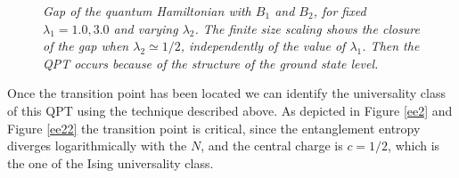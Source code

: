 \documentclass[aps,pra,superscriptaddress]{revtex4}
\renewcommand{\(}{\left(}
\renewcommand{\)}{\right)}
\renewcommand{\[}{\left[}
\renewcommand{\]}{\right]}
\begin{document}
\begin{figure}[H]
\center
{}
\caption{{\em Gap of the quantum Hamiltonian with $B_1$ and $B_2$, for fixed $\lambda_1=1.0,3.0$ and varying $\lambda_2$. The finite size scaling shows the closure of the gap when $\lambda_2 \simeq 1/2$, independently of the value of $\lambda_1$. Then the QPT occurs because of the structure of the ground state level. }}
\label{gap2}
\end{figure}
\noindent
Once the transition point has been located we can identify the universality class of this QPT using the technique described above. As depicted in Figure \ref{ee2} and Figure \ref{ee22} the transition point is critical, since the entanglement entropy diverges logarithmically with the $N$, and the central charge is $c = 1/2$, which is the one of the Ising universality class.  
\end{document}
